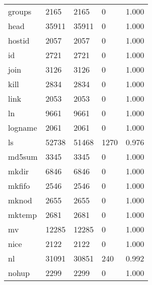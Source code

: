 \begin{longtable}{lp{4.5cm}p{4.5cm}p{4.5cm}p{4.5cm}}
groups    &                     2165 &         2165 &             0 &                    1.000 \\
head      &                    35911 &        35911 &             0 &                    1.000 \\
hostid    &                     2057 &         2057 &             0 &                    1.000 \\
id        &                     2721 &         2721 &             0 &                    1.000 \\
join      &                     3126 &         3126 &             0 &                    1.000 \\
kill      &                     2834 &         2834 &             0 &                    1.000 \\
link      &                     2053 &         2053 &             0 &                    1.000 \\
ln        &                     9661 &         9661 &             0 &                    1.000 \\
logname   &                     2061 &         2061 &             0 &                    1.000 \\
ls        &                    52738 &        51468 &          1270 &                    0.976 \\
md5sum    &                     3345 &         3345 &             0 &                    1.000 \\
mkdir     &                     6846 &         6846 &             0 &                    1.000 \\
mkfifo    &                     2546 &         2546 &             0 &                    1.000 \\
mknod     &                     2655 &         2655 &             0 &                    1.000 \\
mktemp    &                     2681 &         2681 &             0 &                    1.000 \\
mv        &                    12285 &        12285 &             0 &                    1.000 \\
nice      &                     2122 &         2122 &             0 &                    1.000 \\
nl        &                    31091 &        30851 &           240 &                    0.992 \\
nohup     &                     2299 &         2299 &             0 &                    1.000 \\

\end{longtable}
